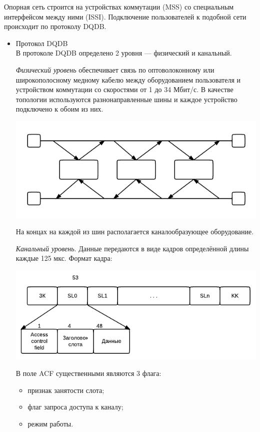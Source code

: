 \documentclass[12pt, russian, oneside, article]{ncc}
\begin{document}
Опорная сеть строится на устройствах коммутации (MSS) со специальным интерфейсом между ними (ISSI). Подключение пользователей к подобной сети происходит по протоколу DQDB.
\begin{itemize}

\item Протокол DQDB\\
\label{sec-5_2_4_1}%
В протоколе DQDB определено 2 уровня --- физический и канальный.

\emph{Физический уровень} обеспечивает связь по оптоволоконному или широкополосному медному кабелю между оборудованием пользователя и устройством коммутации со скоростями от 1 до 34 Мбит/с. В качестве топологии используются разнонаправленные шины и каждое устройство подключено к обоим из них.

\includegraphics[]{images/SiSPI/dqdb.png}

На концах на каждой из шин располагается каналообразующее оборудование.

\emph{Канальный уровень}. Данные передаются в виде кадров определённой длины каждые 125 мкс. Формат кадра:

\includegraphics[]{images/SiSPI/chan.png}

В поле ACF существенными являются 3 флага:
\begin{itemize}
\item признак занятости слота;
\item флаг запроса доступа к каналу;
\item режим работы.
\end{itemize}
  

\end{itemize}
\end{document}
